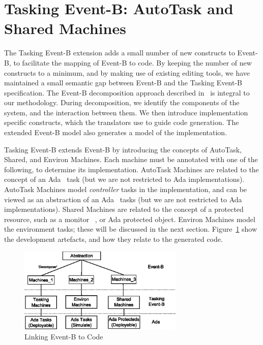 
\section{Tasking Event-B: AutoTask and Shared Machines}\label{TEB}
The Tasking Event-B extension adds a small number of new constructs to Event-B, to facilitate the mapping of Event-B to code. By keeping the number of new constructs to a minimum, and by making use of existing editing tools, we have maintained a small semantic gap between Event-B and the Tasking Event-B specification. The Event-B decomposition approach described in~\cite{Butler09a, decomp2010b} is integral to our methodology. During decomposition, we identify the components of the system, and the interaction between them. We then introduce implementation specific constructs, which the translators use to guide code generation. The extended Event-B model also generates a model of the implementation. 


Tasking Event-B extends Event-B by introducing the concepts of AutoTask, Shared, and Environ Machines. Each machine must be annotated with one of the following, to determine its implementation. AutoTask Machines are related to the concept of an Ada~\cite{ADA2002} task (but we are not restricted to Ada implementations). AutoTask Machines model \emph{controller} tasks in the implementation, and can be viewed as an abstraction of an Ada~\cite{ADA2002} tasks (but we are not restricted to Ada implementations). Shared Machines are related to the concept of a protected resource, such as a monitor ~\cite{Hoare74}, or Ada protected object. Environ Machines model the environment tasks; these will be discussed in the next section. Figure~\ref{fig:route2code} show the development artefacts, and how they relate to the generated code. 
%
\begin{figure}
\centering
		\includegraphics[width=0.7\textwidth]{pictures/route2code.eps}
	\caption{Linking Event-B to Code}
	\label{fig:route2code}
\end{figure}
%


